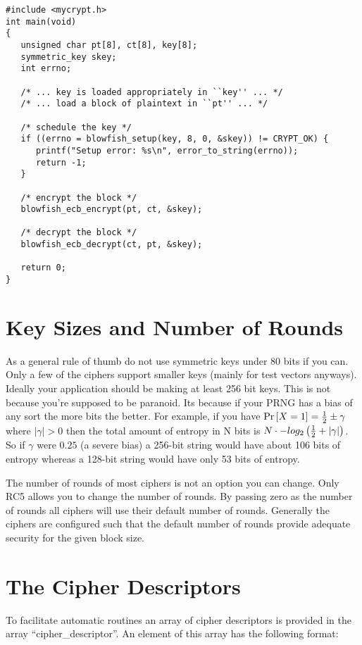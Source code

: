 \documentclass{book}
\begin{document}
\begin{small}
\begin{verbatim}
#include <mycrypt.h>
int main(void)
{ 
   unsigned char pt[8], ct[8], key[8];
   symmetric_key skey;
   int errno;

   /* ... key is loaded appropriately in ``key'' ... */
   /* ... load a block of plaintext in ``pt'' ... */

   /* schedule the key */
   if ((errno = blowfish_setup(key, 8, 0, &skey)) != CRYPT_OK) {
      printf("Setup error: %s\n", error_to_string(errno));
      return -1;
   }

   /* encrypt the block */
   blowfish_ecb_encrypt(pt, ct, &skey);

   /* decrypt the block */
   blowfish_ecb_decrypt(ct, pt, &skey);

   return 0;
}
\end{verbatim}
\end{small}

\section{Key Sizes and Number of Rounds}
As a general rule of thumb do not use symmetric keys under 80 bits if you can.  Only a few of the ciphers support smaller
keys (mainly for test vectors anyways).  Ideally your application should be making at least 256 bit keys.  This is not
because you're supposed to be paranoid.  Its because if your PRNG has a bias of any sort the more bits the better.  For
example, if you have $\mbox{Pr}\left[X = 1\right] = {1 \over 2} \pm \gamma$ where $\vert \gamma \vert > 0$ then the
total amount of entropy in N bits is $N \cdot -log_2\left ({1 \over 2} + \vert \gamma \vert \right)$.  So if $\gamma$
were $0.25$ (a severe bias) a 256-bit string would have about 106 bits of entropy whereas a 128-bit string would have
only 53 bits of entropy.

The number of rounds of most ciphers is not an option you can change.  Only RC5 allows you to change the number of
rounds.  By passing zero as the number of rounds all ciphers will use their default number of rounds.  Generally the
ciphers are configured such that the default number of rounds provide adequate security for the given block size.

\section{The Cipher Descriptors}
To facilitate automatic routines an array of cipher descriptors is provided in the array ``cipher\_descriptor''.  An element
of this array has the following format:
\end{document}
